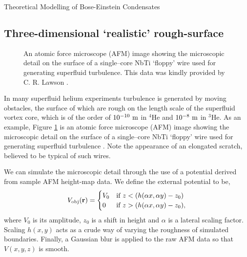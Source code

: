 \begin{chapter}{\label{cha:theoretical_model}Theoretical Modelling of Bose-Einstein Condensates}
\subsection{\label{section:3dafmpotential} Three-dimensional `realistic' rough-surface}
\begin{figure}
	\centering
  \caption{An atomic force microscope (AFM) image showing the microscopic detail on the surface of a  single--core NbTi `floppy' wire used for generating superfluid turbulence. This data was kindly provided by C. R. Lawson \cite{Lawson}.}\label{fig_afmprofile}
 \end{figure}

In many superfluid helium experiments \cite{VinenSkrbek2008} turbulence is generated by moving obstacles, the surface of which are rough on the length scale of the superfluid vortex core, which is of
the order of $10^{-10}~\rm m$ in $^4$He
and $10^{-8}~\rm m$ in $^3$He.  As an example, Figure \ref{fig_afmprofile} is an atomic force microscope (AFM) image showing the microscopic detail on the surface of a  single--core NbTi `floppy' wire used for generating superfluid turbulence  \cite{Bradley2011}.  Note the appearance of an elongated scratch, believed to be typical of such wires.

We can simulate the microscopic detail through the use of a potential derived from sample AFM height-map data. We define the external potential to be,
\begin{equation}
V_{\mathrm{obj}}({\bf r}) =
\begin{cases}
V_0 &\mbox{if } z < (h(\alpha x,\alpha y)-z_0)  \\
0 &\mbox{if } z > (h(\alpha x,\alpha y)-z_0),
\end{cases}
\label{eq:potentialAFM3D}
\end{equation}
where $V_0$ is its amplitude, $z_0$ is a shift in height and $\alpha$ is a lateral scaling factor. Scaling $h(x,y)$ acts as a crude way of varying the roughness of simulated boundaries. Finally, a Gaussian blur is applied to the raw AFM data so that $V(x,y,z)$ is smooth.

\end{chapter}
